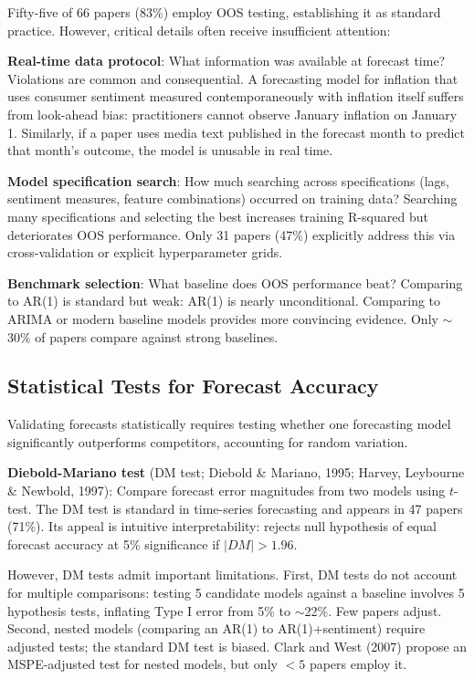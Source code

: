 \documentclass[11pt,twocolumn]{article}
\begin{document}
Fifty-five of 66 papers (83\%) employ OOS testing, establishing it as standard practice. However, critical details often receive insufficient attention:

\textbf{Real-time data protocol}: What information was available at forecast time? Violations are common and consequential. A forecasting model for inflation that uses consumer sentiment measured contemporaneously with inflation itself suffers from look-ahead bias: practitioners cannot observe January inflation on January 1. Similarly, if a paper uses media text published in the forecast month to predict that month's outcome, the model is unusable in real time.

\textbf{Model specification search}: How much searching across specifications (lags, sentiment measures, feature combinations) occurred on training data? Searching many specifications and selecting the best increases training R-squared but deteriorates OOS performance. Only 31 papers (47\%) explicitly address this via cross-validation or explicit hyperparameter grids.

\textbf{Benchmark selection}: What baseline does OOS performance beat? Comparing to AR(1) is standard but weak: AR(1) is nearly unconditional. Comparing to ARIMA or modern baseline models provides more convincing evidence. Only $\sim$30\% of papers compare against strong baselines.

\subsection{Statistical Tests for Forecast Accuracy}

Validating forecasts statistically requires testing whether one forecasting model significantly outperforms competitors, accounting for random variation.

\textbf{Diebold-Mariano test} (DM test; Diebold \& Mariano, 1995; Harvey, Leybourne \& Newbold, 1997): Compare forecast error magnitudes from two models using $t$-test. The DM test is standard in time-series forecasting and appears in 47 papers (71\%). Its appeal is intuitive interpretability: rejects null hypothesis of equal forecast accuracy at 5\% significance if $|DM| > 1.96$.

However, DM tests admit important limitations. First, DM tests do not account for multiple comparisons: testing 5 candidate models against a baseline involves 5 hypothesis tests, inflating Type I error from 5\% to $\sim$22\%. Few papers adjust. Second, nested models (comparing an AR(1) to AR(1)+sentiment) require adjusted tests; the standard DM test is biased. Clark and West (2007) propose an MSPE-adjusted test for nested models, but only $<5$ papers employ it.
\end{document}
